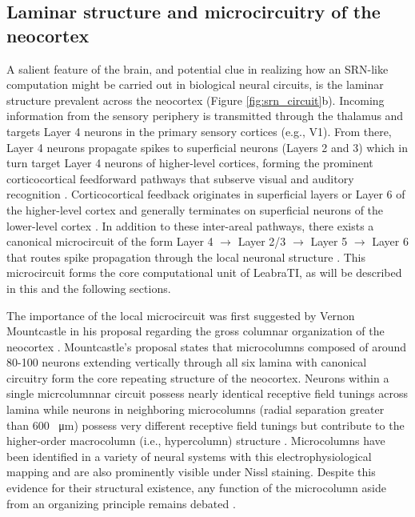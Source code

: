 \documentclass[dwyatte_dissertation.tex]{subfiles}
\begin{document}
\subsection{Laminar structure and microcircuitry of the neocortex}

A salient feature of the brain, and potential clue in realizing how an SRN-like computation might be carried out in biological neural circuits, is the laminar structure prevalent across the neocortex (Figure \ref{fig:srn_circuit}b). Incoming information from the sensory periphery is transmitted through the thalamus and targets Layer 4 neurons in the primary sensory cortices (e.g., V1). From there, Layer 4 neurons propagate spikes to superficial neurons (Layers 2 and 3) which in turn target Layer 4 neurons of higher-level cortices, forming the prominent corticocortical feedforward pathways that subserve visual and auditory recognition \cite{FellemanVanEssen91}. Corticocortical feedback originates in superficial layers or Layer 6 of the higher-level cortex and generally terminates on superficial neurons of the lower-level cortex \cite{RocklandPandya79}. In addition to these inter-areal pathways, there exists a canonical microcircuit of the form Layer 4 $\rightarrow$ Layer 2/3 $\rightarrow$ Layer 5 $\rightarrow$ Layer 6 that routes spike propagation through the local neuronal structure \cite{DouglasMartin04,ThomsonLamy07}. This microcircuit forms the core computational unit of LeabraTI, as will be described in this and the following sections.

The importance of the local microcircuit was first suggested by Vernon Mountcastle in his proposal regarding the gross columnar organization of the neocortex \cite[see][for a comprehensive review]{Mountcastle97}. Mountcastle's proposal states that microcolumns composed of around 80-100 neurons extending vertically through all six lamina with canonical circuitry form the core repeating structure of the neocortex. Neurons within a single micrcolumnnar circuit possess nearly identical receptive field tunings across lamina while neurons in neighboring microcolumns (radial separation greater than 600 \SI{}{\micro\meter}) possess very different receptive field tunings but contribute to the higher-order macrocolumn (i.e., hypercolumn) structure \cite{HubelWiesel77,Jones00}. Microcolumns have been identified in a variety of neural systems with this electrophysiological mapping and are also prominently visible under Nissl staining. Despite this evidence for their structural existence, any function of the microcolumn aside from an organizing principle remains debated \cite{BuxhoevedenCasanova02,HortonAdams05}.
\end{document}
